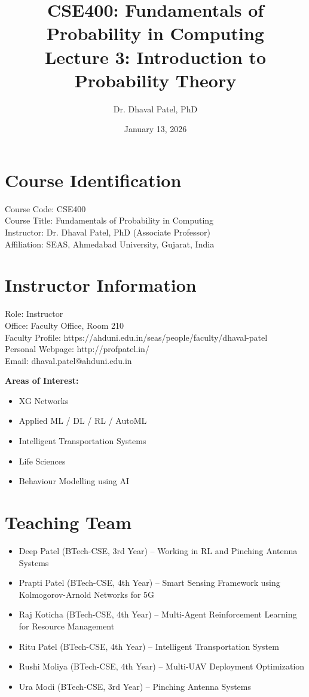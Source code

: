 \documentclass[12pt]{article}
\begin{document}
\title{CSE400: Fundamentals of Probability in Computing\\
Lecture 3: Introduction to Probability Theory}
\author{Dr. Dhaval Patel, PhD}
\date{January 13, 2026}
\maketitle

\section*{Course Identification}

Course Code: CSE400\\
Course Title: Fundamentals of Probability in Computing\\
Instructor: Dr. Dhaval Patel, PhD (Associate Professor)\\
Affiliation: SEAS, Ahmedabad University, Gujarat, India

\section*{Instructor Information}

Role: Instructor\\
Office: Faculty Office, Room 210\\
Faculty Profile: https://ahduni.edu.in/seas/people/faculty/dhaval-patel\\
Personal Webpage: http://profpatel.in/\\
Email: dhaval.patel@ahduni.edu.in

\textbf{Areas of Interest:}
\begin{itemize}
\item XG Networks
\item Applied ML / DL / RL / AutoML
\item Intelligent Transportation Systems
\item Life Sciences
\item Behaviour Modelling using AI
\end{itemize}

\section*{Teaching Team}

\begin{itemize}
\item Deep Patel (BTech-CSE, 3rd Year) -- Working in RL and Pinching Antenna Systems
\item Prapti Patel (BTech-CSE, 4th Year) -- Smart Sensing Framework using Kolmogorov-Arnold Networks for 5G
\item Raj Koticha (BTech-CSE, 4th Year) -- Multi-Agent Reinforcement Learning for Resource Management
\item Ritu Patel (BTech-CSE, 4th Year) -- Intelligent Transportation System
\item Rushi Moliya (BTech-CSE, 4th Year) -- Multi-UAV Deployment Optimization
\item Ura Modi (BTech-CSE, 3rd Year) -- Pinching Antenna Systems
\end{itemize}
\end{document}
